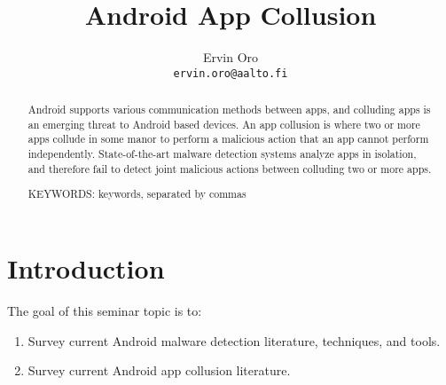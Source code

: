 \documentclass[article,oneside]{aaltoseries}
\begin{document}
 

\title{Android App Collusion}

\author{Ervin Oro%
\\\textnormal{\texttt{ervin.oro@aalto.fi}}} %


\maketitle


\begin{abstract}
Android supports various communication methods between apps, and colluding apps is an emerging threat to Android based devices. An app collusion is where two or more apps collude in some manor to perform a malicious action that an app cannot perform independently. State-of-the-art malware detection systems analyze apps in isolation, and therefore fail to detect joint malicious actions between colluding two or more apps.

\vspace{3mm}
\noindent KEYWORDS: keywords, separated by commas

\end{abstract}




\section{Introduction}

The goal of this seminar topic is to:
\begin{enumerate}
	\item Survey current Android malware detection literature, techniques, and tools.
	\item Survey current Android app collusion literature.
\end{enumerate}



\nocite{*}


\end{document}
